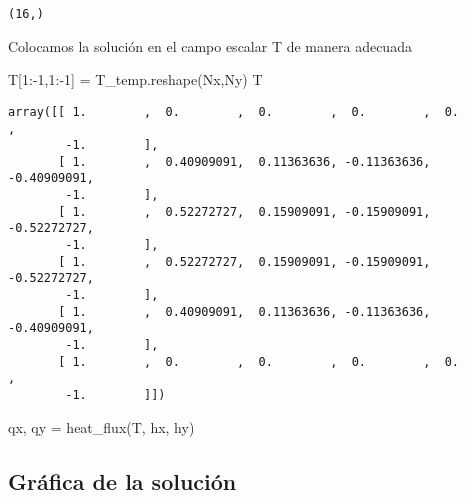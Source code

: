 \documentclass[
  letterpaper,
  DIV=11,
  numbers=noendperiod]{scrreprt}
\newenvironment{Shaded}{\begin{snugshade}}{\end{snugshade}}
\newcommand{\DecValTok}[1]{\textcolor[rgb]{0.68,0.00,0.00}{#1}}
\newcommand{\NormalTok}[1]{\textcolor[rgb]{0.00,0.23,0.31}{#1}}
\newcommand{\OperatorTok}[1]{\textcolor[rgb]{0.37,0.37,0.37}{#1}}
\begin{document}
\begin{verbatim}
(16,)
\end{verbatim}

Colocamos la solución en el campo escalar T de manera adecuada

\begin{Shaded}
\begin{Highlighting}[]
\NormalTok{T[}\DecValTok{1}\NormalTok{:}\OperatorTok{{-}}\DecValTok{1}\NormalTok{,}\DecValTok{1}\NormalTok{:}\OperatorTok{{-}}\DecValTok{1}\NormalTok{] }\OperatorTok{=}\NormalTok{ T\_temp.reshape(Nx,Ny)}
\NormalTok{T}
\end{Highlighting}
\end{Shaded}

\begin{verbatim}
array([[ 1.        ,  0.        ,  0.        ,  0.        ,  0.        ,
        -1.        ],
       [ 1.        ,  0.40909091,  0.11363636, -0.11363636, -0.40909091,
        -1.        ],
       [ 1.        ,  0.52272727,  0.15909091, -0.15909091, -0.52272727,
        -1.        ],
       [ 1.        ,  0.52272727,  0.15909091, -0.15909091, -0.52272727,
        -1.        ],
       [ 1.        ,  0.40909091,  0.11363636, -0.11363636, -0.40909091,
        -1.        ],
       [ 1.        ,  0.        ,  0.        ,  0.        ,  0.        ,
        -1.        ]])
\end{verbatim}

\begin{Shaded}
\begin{Highlighting}[]
\NormalTok{qx, qy }\OperatorTok{=}\NormalTok{ heat\_flux(T, hx, hy)}
\end{Highlighting}
\end{Shaded}

\subsection{Gráfica de la solución}\label{gruxe1fica-de-la-soluciuxf3n}
\end{document}
